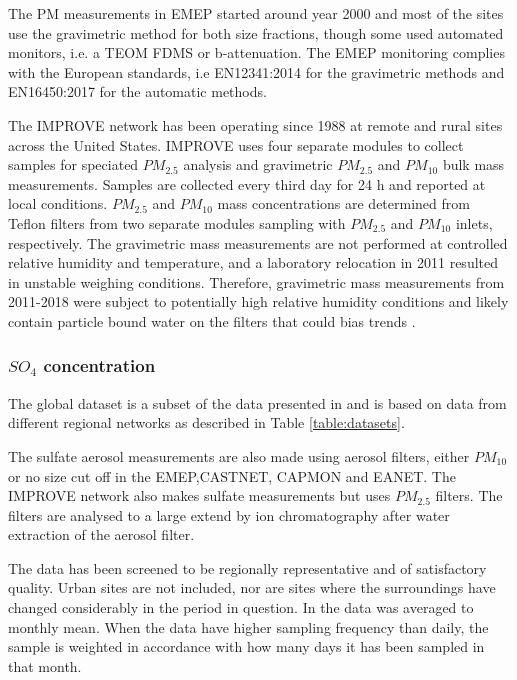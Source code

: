 \documentclass[journal abbreviation, manuscript]{copernicus}
\begin{document}
The PM measurements in EMEP started around year 2000  \citep{torseth2012} and most of the sites use the gravimetric method for both size fractions, though some used automated monitors, i.e. a TEOM FDMS or b-attenuation. The EMEP monitoring complies with the European standards, i.e EN12341:2014 for the gravimetric methods and  EN16450:2017 for the automatic methods. 

The IMPROVE network has been operating since 1988 at remote and rural sites across the United States. IMPROVE uses four separate modules to collect samples for speciated $PM_{2.5}$ analysis and gravimetric $PM_{2.5}$ and $PM_{10}$ bulk mass measurements. Samples are collected every third day for 24 h and reported at local conditions. $PM_{2.5}$ and $PM_{10}$ mass concentrations are determined from Teflon filters from two separate modules sampling with $PM_{2.5}$ and $PM_{10}$ inlets, respectively. The gravimetric mass measurements are not performed at controlled relative humidity and temperature, and a laboratory relocation in 2011 resulted in unstable weighing conditions. Therefore, gravimetric mass measurements from 2011-2018 were subject to potentially high relative humidity conditions and likely contain particle bound water on the filters that could bias trends \citep{Hand2019}.



\subsubsection{$SO_{4}$ concentration}
 The global dataset is a subset of the  data presented in \cite{aas2019global} and is based on data from different regional networks as described in Table \ref{table:datasets}.

The sulfate aerosol measurements are also made using aerosol filters, either $PM_{10}$ or no size cut off in the EMEP,CASTNET, CAPMON and EANET.  The IMPROVE network also makes sulfate measurements but uses $PM_{2.5}$ filters. The filters are analysed to a large extend by ion chromatography after water extraction of the aerosol filter.

The data has been screened to be regionally representative and of satisfactory quality. Urban sites are not included, nor are sites where the surroundings have changed considerably in the period in question.
In \cite{aas2019global} the data  was averaged to monthly mean.  When the data have higher sampling frequency than daily, the sample is weighted in accordance with how many days it has been sampled in that month.
\end{document}
